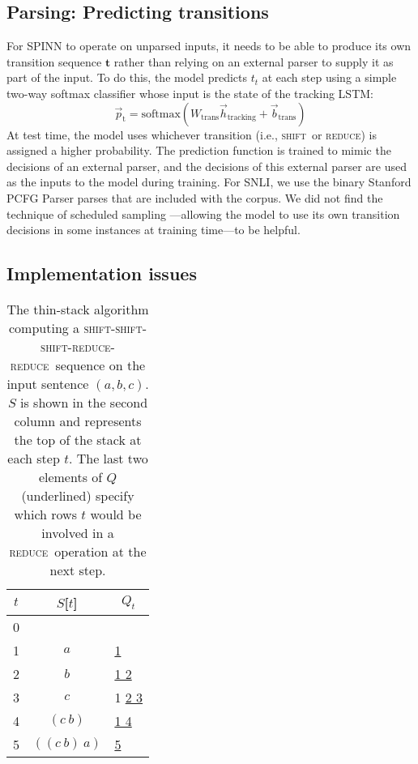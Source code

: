 \documentclass[11pt]{article}
\newcommand{\shift}{\textsc{shift}}
\newcommand{\reduce}{\textsc{reduce}}
\begin{document}
\subsection{Parsing: Predicting transitions}

For SPINN to operate on unparsed inputs, it needs to be able to produce its own transition sequence $\mathbf t$ rather than relying on an external parser to supply it as part of the input. To do this, the model predicts $t_t$ at each step using a simple two-way softmax classifier whose input is the state of the tracking LSTM:
\begin{equation}
\vec{p}_{\text{t}} = \text{softmax}(W_{\text{trans}}\vec{h}_{\text{tracking}} + \vec{b}_{\text{trans}})
\end{equation}
At test time, the model uses whichever transition (i.e., \shift\ or \reduce) is assigned a higher probability. The prediction function is trained to mimic the decisions of an external parser, and the decisions of this external parser are used as the inputs to the model during training. For SNLI, we use the binary Stanford PCFG Parser parses that are included with the corpus. We did not find the technique of scheduled sampling \citep{bengio2015scheduled}---allowing the model to use its own transition decisions in some instances at training time---to be helpful.

\subsection{Implementation issues}

\begin{table}[t]
\centering
\begin{tabular}{c|cl}
  \toprule
  $t$ & $S$[$t$] & \multicolumn{1}{c}{$Q_t$} \\
  \midrule
  0 & & \underline{\hphantom{0} \hphantom{0}} \\
  1 & $a$ & \hphantom{0} \underline{\hphantom{0} 1} \\
  2 & $b$ & \hphantom{0} \hphantom{0} \underline{1 2} \\
  3 & $c$ & \hphantom{0} \hphantom{0} 1 \underline{2 3} \\
  4 & $(c~b)$ & \hphantom{0} \hphantom{0} \underline{1 4} \\
  5 & $((c~b)~a)$ & \hphantom{0} \underline{\hphantom{0} 5} \\
  \bottomrule
\end{tabular}
\caption{The thin-stack algorithm computing a \shift-\shift-\shift-\reduce-\reduce\ sequence on the input sentence $(a, b, c)$. $S$ is shown in the second column and represents the top of the stack at each step $t$. The last two elements of $Q$ (underlined) specify which rows $t$ would be involved in a \reduce\ operation at the next step.}
\label{tbl:thin-stack}
\end{table}
\end{document}
